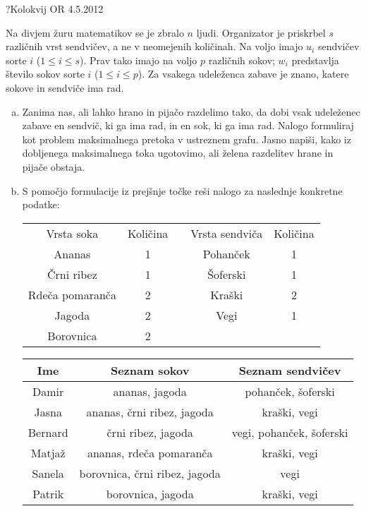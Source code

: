 \begin{naloga}{?}{Kolokvij OR 4.5.2012}
\begin{vprasanje}
Na divjem žuru matematikov se je zbralo $n$ ljudi.
Organizator je priskrbel $s$ različnih vrst sendvičev,
a ne v neomejenih količinah.
Na voljo imajo $u_i$ sendvičev sorte $i$ ($1 \le i \le s$).
Prav tako imajo na voljo $p$ različnih sokov;
$w_i$ predstavlja število sokov sorte $i$ ($1 \le i \le p$).
Za vsakega udeleženca zabave je znano,
katere sokove in sendviče ima rad.

\begin{enumerate}[(a)]
\item Zanima nas, ali lahko hrano in pijačo razdelimo tako,
da dobi vsak udeleženec zabave en sendvič, ki ga ima rad,
in en sok, ki ga ima rad.
Nalogo formuliraj kot problem maksimalnega pretoka v ustreznem grafu.
Jasno napiši, kako iz dobljenega maksimalnega toka ugotovimo,
ali želena razdelitev hrane in pijače obstaja.

\item S pomočjo formulacije iz prejšnje točke
reši nalogo za naslednje konkretne podatke:
\begin{center}
\begin{tabular}{c|ccc|c}
Vrsta soka & Količina & \quad & Vrsta sendviča & Količina \\
\cline{1-2} \cline{4-5}
Ananas          & 1 && Pohanček & 1 \\
Črni ribez      & 1 && Šoferski & 1 \\
Rdeča pomaranča & 2 && Kraški   & 2 \\
Jagoda          & 2 && Vegi     & 1 \\
Borovnica       & 2
\end{tabular}

\bigskip
\begin{tabular}{c|c|c}
Ime & Seznam sokov & Seznam sendvičev \\ \hline
Damir   & ananas, jagoda                & pohanček, šoferski       \\
Jasna   & ananas, črni ribez, jagoda    & kraški, vegi             \\
Bernard & črni ribez, jagoda            & vegi, pohanček, šoferski \\
Matjaž  & ananas, rdeča pomaranča       & kraški, vegi             \\
Sanela  & borovnica, črni ribez, jagoda & vegi                     \\
Patrik  & borovnica, jagoda             & kraški, vegi
\end{tabular}
\end{center}
\end{enumerate}
\end{vprasanje}
\begin{odgovor}
\end{odgovor}
\end{naloga}


